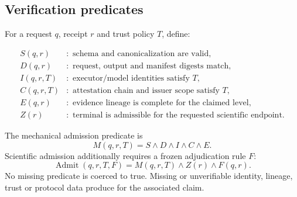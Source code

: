 \subsection{Verification predicates}

For a request $q$, receipt $r$ and trust policy $T$, define:

\begin{align*}
S(q,r) &:\text{ schema and canonicalization are valid},\\
D(q,r) &:\text{ request, output and manifest digests match},\\
I(q,r,T) &:\text{ executor/model identities satisfy }T,\\
C(q,r,T) &:\text{ attestation chain and issuer scope satisfy }T,\\
E(q,r) &:\text{ evidence lineage is complete for the claimed level},\\
Z(r) &:\text{ terminal is admissible for the requested scientific endpoint}.
\end{align*}

The mechanical admission predicate is
\[
M(q,r,T)=S\land D\land I\land C\land E.
\]
Scientific admission additionally requires a frozen adjudication rule $F$:
\[
\operatorname{Admit}(q,r,T,F)=M(q,r,T)\land Z(r)\land F(q,r).
\]
No missing predicate is coerced to true. Missing or unverifiable identity,
lineage, trust or protocol data produce \cannotcheck{} for the associated claim.

